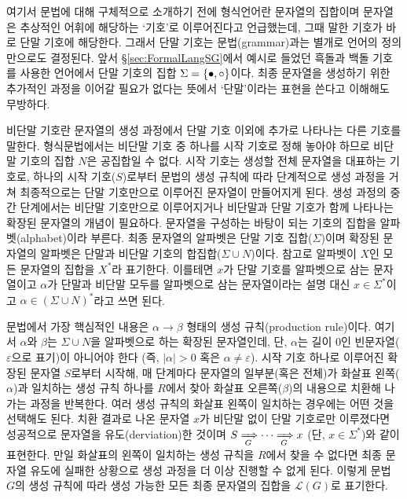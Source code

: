여기서 문법에 대해 구체적으로 소개하기 전에 형식언어란 문자열의 집합이며
문자열은 추상적인 어휘에 해당하는 `기호'로 이루어진다고 언급했는데,
그때 말한 기호가 바로 단말 기호에 해당한다.
그래서 단말 기호는 문법(grammar)과는 별개로 언어의 정의만으로도 결정된다.
앞서 \S\ref{sec:FormalLangSG}에서 예시로 들었던 흑돌과 백돌 기호를 사용한
언어에서 단말 기호의 집합 $\Sigma = \{\bullet, \circ\}$이다.
최종 문자열을 생성하기 위한 추가적인 과정을 이어갈 필요가 없다는 뜻에서
`단말'이라는 표현을 쓴다고 이해해도 무방하다.

비단말 기호란 문자열의 생성 과정에서 단말 기호 이외에 추가로 나타나는
다른 기호를 말한다. 형식문법에서는 비단말 기호 중 하나를 시작 기호로
정해 놓아야 하므로 비단말 기호의 집합 $N$은 공집합일 수 없다. 시작 기호는
생성할 전체 문자열을 대표하는 기호로, 하나의 시작 기호($S$)로부터 문법의
생성 규칙에 따라 단계적으로 생성 과정을 거쳐 최종적으로는 단말 기호만으로
이루어진 문자열이 만들어지게 된다. 생성 과정의 중간 단계에서는 비단말 기호만으로
이루어지거나 비단말과 단말 기호가 함께 나타나는 확장된 문자열의 개념이 필요하다.
문자열을 구성하는 바탕이 되는 기호의 집합을 알파벳(alphabet)이라 부른다.
최종 문자열의 알파벳은 단말 기호 집합($\Sigma$)이며 확장된 문자열의 알파벳은
단말과 비단말 기호의 합집합($\Sigma\cup N$)이다. 참고로 알파벳이 $X$인
모든 문자열의 집합을 $X^{*}$라 표기한다. 이를테면
$x$가 단말 기호를 알파벳으로 삼는 문자열이고
$\alpha$가 단말과 비단말 모두를 알파벳으로 삼는 문자열이라는
설명 대신 $x\in\Sigma^{*}$이고 $\alpha\in(\Sigma\cup N)^{*}$라고 쓰면 된다.

문법에서 가장 핵심적인 내용은 $\alpha\to\beta$ 형태의 생성 규칙(production rule)이다.
여기서 $\alpha$와 $\beta$는  $\Sigma\cup N$을 알파벳으로 하는 확장된 문자열인데,
단, $\alpha$는 길이 0인 빈문자열($\varepsilon$으로 표기)이 아니어야 한다
(즉, $\lvert\alpha\rvert>0$ 혹은 $\alpha\neq\varepsilon$).
시작 기호 하나로 이루어진 확장된 문자열 $S$로부터 시작해, 매 단계마다
문자열의 일부분(혹은 전체)가 화살표 왼쪽($\alpha$)과 일치하는 생성 규칙
하나를 $R$에서 찾아 화살표 오른쪽($\beta$)의 내용으로 치환해 나가는 과정을
반복한다. 여러 생성 규칙의 화살표 왼쪽이 일치하는 경우에는 어떤 것을 선택해도 된다.
치환 결과로 나온 문자열 $x$가 비단말 없이 단말 기호로만 이루졌다면
성공적으로 문자열을 유도(derviation)한 것이며
$S\xRightarrow[\,G]{} \cdots \xRightarrow[\,G]{} x$ (단, $x\in\Sigma^{*}$)와 같이 표현한다.
만일 화살표의 왼쪽이 일치하는 생성 규칙을 $R$에서 찾을 수 없다면
최종 문자열 유도에 실패한 상황으로 생성 과정을 더 이상 진행할 수 없게 된다.
이렇게 문법 $G$의 생성 규칙에 따라 생성 가능한 모든 최종 문자열의 집합을
$\mathcal{L}(G)$로 표기한다.

